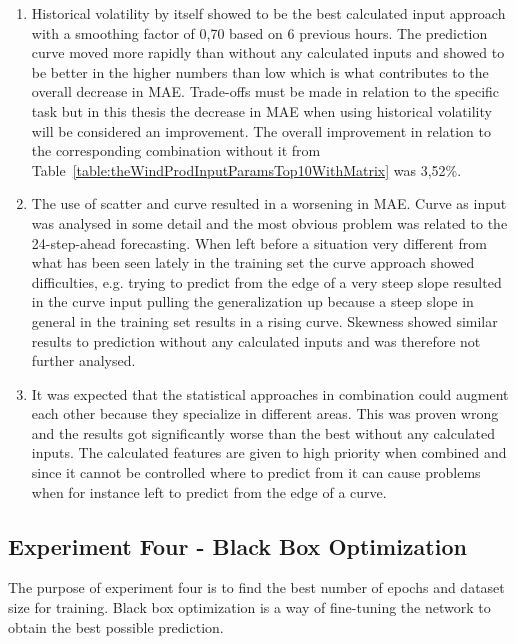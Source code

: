 \begin{enumerate}
\item Historical volatility by itself showed to be the best calculated input approach with a smoothing factor of 0,70 based on 6 previous hours. The prediction curve moved more rapidly than without any calculated inputs and showed to be better in the higher numbers than low which is what contributes to the overall decrease in MAE. Trade-offs must be made in relation to the specific task but in this thesis the decrease in MAE when using historical volatility will be considered an improvement. The overall improvement in relation to the corresponding combination without it from Table~\ref{table:theWindProdInputParamsTop10WithMatrix} was 3,52\%.
\item The use of scatter and curve resulted in a worsening in MAE. Curve as input was analysed in some detail and the most obvious problem was related to the 24-step-ahead forecasting. When left before a situation very different from what has been seen lately in the training set the curve approach showed difficulties, e.g. trying to predict from the edge of a very steep slope resulted in the curve input pulling the generalization up because a steep slope in general in the training set results in a rising curve. Skewness showed similar results to prediction without any calculated inputs and was therefore not further analysed.
\item It was expected that the statistical approaches in combination could augment each other because they specialize in different areas. This was proven wrong and the results got significantly worse than the best without any calculated inputs. The calculated features are given to high priority when combined and since it cannot be controlled where to predict from it can cause problems when for instance left to predict from the edge of a curve. 
\end{enumerate}

\newpage

\subsection{Experiment Four - Black Box Optimization}
The purpose of experiment four is to find the best number of epochs and dataset size for training. Black box optimization is a way of fine-tuning the network to obtain the best possible prediction.

